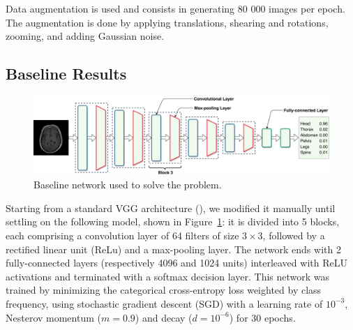 Data augmentation is used and consists in generating 80 000 images per epoch. The augmentation is done by applying translations, shearing and rotations, zooming, and adding Gaussian noise.

\subsection{Baseline Results}

\begin{figure}[htb]
	\centering
	\includegraphics[width=\linewidth]{img_hyperopt/baseline.pdf}
	\caption{Baseline network used to solve the problem.}
	\label{fig:baseline}
\end{figure}

Starting from a standard VGG architecture (\textcite{simonyan2014}), we modified it manually until settling on the following model, shown in Figure~\ref{fig:baseline}: it is divided into 5 blocks, each comprising a convolution layer of 64 filters of size $3\times 3$, followed by a rectified linear unit (ReLu) and a max-pooling layer. The network ends with 2 fully-connected layers (respectively 4096 and 1024 units) interleaved with ReLU activations and terminated with a softmax decision layer. This network was trained by minimizing the categorical cross-entropy loss weighted by class frequency, using stochastic gradient descent (SGD) with a learning rate of $10^{-3}$, Nesterov momentum ($m = 0.9$) and decay ($d = 10^{-6}$) for 30 epochs.

